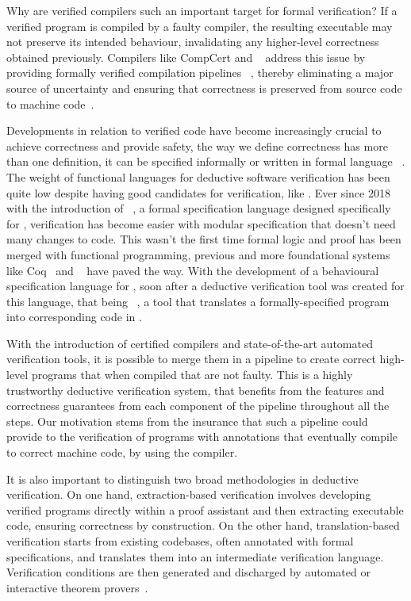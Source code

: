 Why are verified compilers such an important target for formal verification? If a verified program is compiled by a 
faulty compiler, the resulting executable may not preserve its intended behaviour, invalidating any higher-level correctness
obtained previously. Compilers like CompCert and \cml~\cite{POPL14} address this issue by providing formally verified compilation pipelines
~\cite{LoowKTMNAF19, GrossEPPC22, Leroy09}, thereby eliminating a major source of uncertainty and ensuring that correctness is 
preserved from source code to machine code~\cite{LeroyCompilerMeaning}.

Developments in relation to verified code have become increasingly crucial to achieve correctness and provide safety, 
the way we define correctness has more than one definition, it can be specified informally or written in formal language 
~\cite{Filliatre11}. The weight of functional languages for deductive software verification has been quite low despite having
good candidates for verification, like \ocaml. Ever since 2018 with the introduction of \gospel~\cite{ChargueraudFLP19}, a
formal specification language designed specifically for \ocaml, verification has become easier with modular specification
that doesn't need many changes to \ocaml code. This wasn't the first time formal logic and proof has been merged with 
functional programming, previous and more foundational systems like Coq~\cite{75277.75285} and \whyml~\cite{FilliatreP13} have
paved the way. With the development of a behavioural specification language for \ocaml, soon after a deductive verification tool
was created for this language, that being \cameleer~\cite{PereiraR20}, a tool that translates a formally-specified program into 
corresponding code in \whyml.

With the introduction of certified compilers and state-of-the-art automated verification tools, it is possible to merge them in
a pipeline to create correct high-level programs that when compiled that are not faulty.
This is a highly trustworthy deductive verification system, that benefits from the features and correctness guarantees from each 
component of the pipeline throughout all the steps. Our motivation stems from the insurance that such a pipeline could provide 
to the verification of \ocaml programs with \gospel annotations that eventually compile to correct machine code, by using the \cml
compiler.

It is also important to distinguish two broad methodologies in deductive verification. On one hand, extraction-based verification involves 
developing verified programs directly within a proof assistant and then extracting executable code, ensuring correctness by construction. 
On the other hand, translation-based verification starts from existing codebases, often annotated with formal specifications, and translates 
them into an intermediate verification language. Verification conditions are then generated and discharged by automated or interactive 
theorem provers~\cite{Leroy09}.

